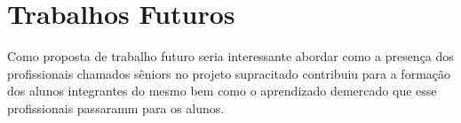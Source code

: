\section{Trabalhos Futuros}
\label{sec:trabalhos}

Como proposta de trabalho futuro seria interessante abordar como a presença dos
profissionais chamados sêniors no projeto supracitado contribuiu para a formação 
dos alunos integrantes do mesmo bem como o aprendizado demercado que esse profissionais 
passaramm para os alunos. 